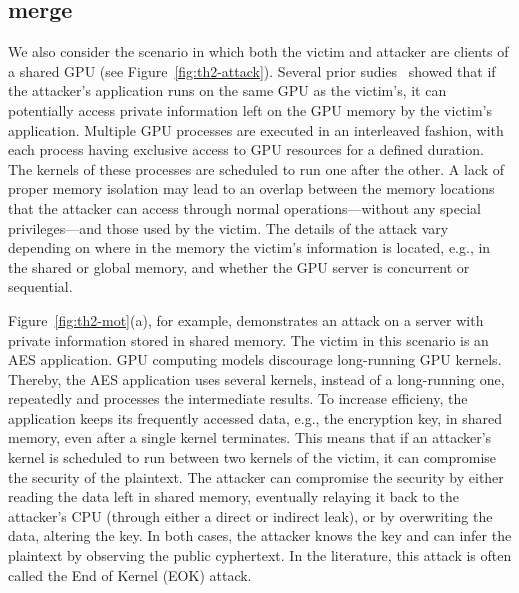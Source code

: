 \subsection{merge}
We also consider the scenario in which both the victim and attacker are clients of a shared GPU (see Figure~\ref{fig:th2-attack}). 
%
Several prior sudies~\cite{lee} showed that if the attacker's application runs on the same GPU as the victim's, it can potentially access private information left on the GPU memory by the victim's application.
%
%
Multiple GPU processes are executed in an interleaved fashion, with each process having exclusive access to GPU resources for a defined duration. The kernels of these processes are scheduled to run one after the other.
%
%
A lack of proper memory isolation may lead to an overlap between the memory locations that the attacker can access through normal operations—without any special privileges—and those used by the victim.
%
%
%
%
%
The details of the attack vary depending on where in the memory the victim's information is located, e.g., in the shared or global memory, and whether the GPU server is concurrent or sequential.
%

Figure~\ref{fig:th2-mot}(a), for example, demonstrates an attack on a server with private information stored in shared memory.
%
The victim in this scenario is an AES application.
% 
GPU computing models discourage long-running GPU kernels. 
%
Thereby, the AES application uses several kernels, instead of a long-running one, repeatedly and processes the intermediate results. 
%
To increase efficieny, the application keeps its frequently accessed data, e.g., the encryption key, in shared memory, even after a single kernel terminates.
%
This means that if an attacker's kernel is scheduled to run between two kernels of the victim, it can compromise the security of the plaintext. 
%
The attacker can compromise the security by either reading the data left in shared memory, eventually relaying it back to the attacker's CPU (through either a direct or indirect leak), or by overwriting the data, altering the key.
%
In both cases, the attacker knows the key and can infer the plaintext by observing the public cyphertext. 
%
In the literature, this attack is often called the End of Kernel (EOK) attack.


